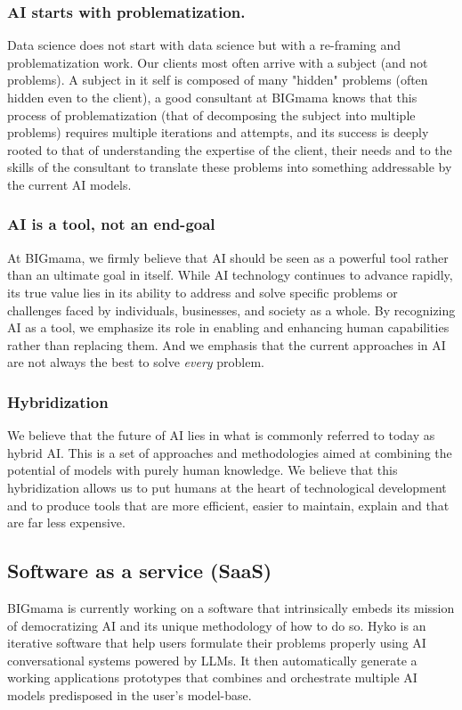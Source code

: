\documentclass[a4paper,12pt]{article}
\begin{document}
\subsubsection{AI starts with problematization.}
Data science does not start with data science but with a re-framing and problematization work. Our clients most often arrive with a subject (and not problems). A subject in it self is composed of many "hidden" problems (often hidden even to the client), a good consultant at BIGmama knows that this process of problematization (that of decomposing the subject into multiple problems) requires multiple iterations and attempts, and its success is deeply rooted to that of understanding the expertise of the client, their needs and to the skills of the consultant to translate these problems into something addressable by the current AI models.

\subsubsection{AI is a tool, not an end-goal}
At BIGmama, we firmly believe that AI should be seen as a powerful tool rather than an ultimate goal in itself. While AI technology continues to advance rapidly, its true value lies in its ability to address and solve specific problems or challenges faced by individuals, businesses, and society as a whole.
By recognizing AI as a tool, we emphasize its role in enabling and enhancing human capabilities rather than replacing them. And we emphasis that the current approaches in AI are not always the best to solve \textit{every} problem.

\subsubsection{Hybridization}
We believe that the future of AI lies in what is commonly referred to today as hybrid AI. This is a set of approaches and methodologies aimed at combining the potential of models with purely human knowledge. We believe that this hybridization allows us to put humans at the heart of technological development and to produce tools that are more efficient, easier to maintain, explain and that are far less expensive.

\subsection{Software as a service (SaaS)}
BIGmama is currently working on a software that intrinsically embeds its mission of democratizing AI and its unique methodology of how to do so. Hyko is an iterative software that help users formulate their problems properly using AI conversational systems powered by LLMs. It then automatically generate a working applications prototypes that combines and orchestrate multiple AI models predisposed in the user's model-base.
\end{document}

